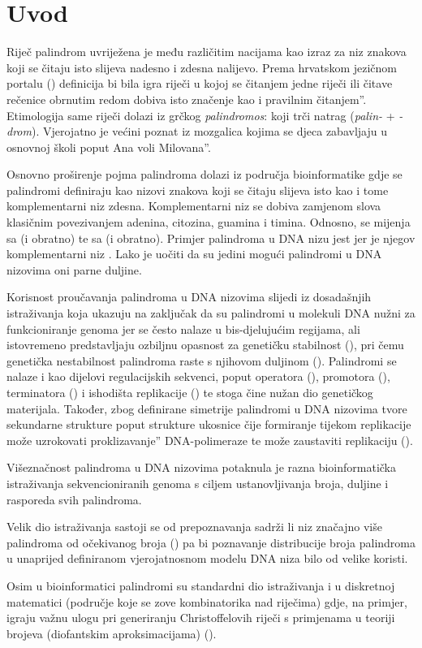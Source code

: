 \section{Uvod}

Riječ palindrom uvriježena je među različitim
nacijama kao izraz za niz znakova koji se
čitaju isto slijeva nadesno i zdesna nalijevo.
Prema hrvatskom jezičnom portalu (\cite{hjp}) definicija bi bila
{\glqq}igra riječi u kojoj se čitanjem jedne riječi ili čitave rečenice 
obrnutim redom dobiva isto značenje kao i pravilnim čitanjem''.
Etimologija same riječi dolazi
iz grčkog \emph{palindromos}: koji trči natrag
(\emph{palin-} + \emph{-drom}).
Vjerojatno je većini poznat iz mozgalica kojima
se djeca zabavljaju u osnovnoj školi poput
{\glqq}Ana voli Milovana''.

Osnovno proširenje pojma palindroma
dolazi iz područja bioinformatike gdje se palindromi
definiraju kao nizovi znakova koji se čitaju slijeva
isto kao i tome komplementarni niz zdesna. 
Komplementarni niz
se dobiva zamjenom slova klasičnim povezivanjem
adenina, citozina, guamina i timina. Odnosno,
 se mijenja sa  (i obratno) te
 sa  (i obratno). Primjer palindroma u DNA
nizu jest  jer je njegov komplementarni niz
. Lako je uočiti 
da su jedini mogući palindromi
u DNA nizovima oni parne duljine.

Korisnost proučavanja palindroma u DNA nizovima slijedi iz dosadašnjih
istraživanja koja ukazuju na zaključak da su palindromi
u molekuli DNA nužni za funkcioniranje genoma jer se često nalaze u 
bis-djelujućim regijama, ali istovremeno predstavljaju ozbiljnu opasnost
za genetičku stabilnost
(\textcite{lobachev_hairpin-_2007}),
pri čemu genetička nestabilnost palindroma raste 
s njihovom duljinom
(\textcite{nag_140-bp-long_1997}).
Palindromi se nalaze i kao dijelovi regulacijskih sekvenci,
poput operatora
(\textcite{sinden_perfect_1983}),
promotora
(\textcite{thukral_two_1991}),
terminatora 
(\textcite{gomes_evolution_2007})
i ishodišta replikacije
(\textcite{chew_scoring_2005})
te stoga čine nužan dio genetičkog materijala.
Također, zbog definirane simetrije palindromi u DNA nizovima
tvore sekundarne strukture poput strukture ukosnice
čije formiranje tijekom 
replikacije može uzrokovati {\glqq}proklizavanje''
DNA-polimeraze te može zaustaviti replikaciju
(\textcite{waldman_long_1999}).

Višeznačnost palindroma u DNA nizovima potaknula je razna
bioinformatička istraživanja sekvencioniranih genoma s ciljem 
ustanovljivanja broja, duljine i rasporeda svih palindroma. 

Velik dio istraživanja sastoji se od prepoznavanja
sadrži li niz značajno 
više palindroma od očekivanog broja
(\textcite{robin_dna_2005})
pa bi poznavanje distribucije
broja palindroma u unaprijed definiranom vjerojatnosnom
modelu DNA niza bilo od velike koristi.

Osim u bioinformatici palindromi su standardni dio
istraživanja i u diskretnoj matematici
(područje koje se zove kombinatorika nad riječima)
gdje, na primjer, igraju važnu ulogu pri generiranju
Christoffelovih riječi
s primjenama u teoriji brojeva 
(diofantskim aproksimacijama)
(\textcite{lothaire_applied_2005,
fischler_palindromic_2006}).

